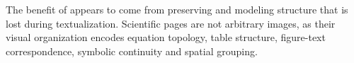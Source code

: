 The benefit of \methodname appears to come from preserving and modeling structure that is lost during textualization. 
Scientific pages are not arbitrary images, as their visual organization encodes equation topology, table structure, figure-text correspondence, symbolic continuity and spatial grouping.
